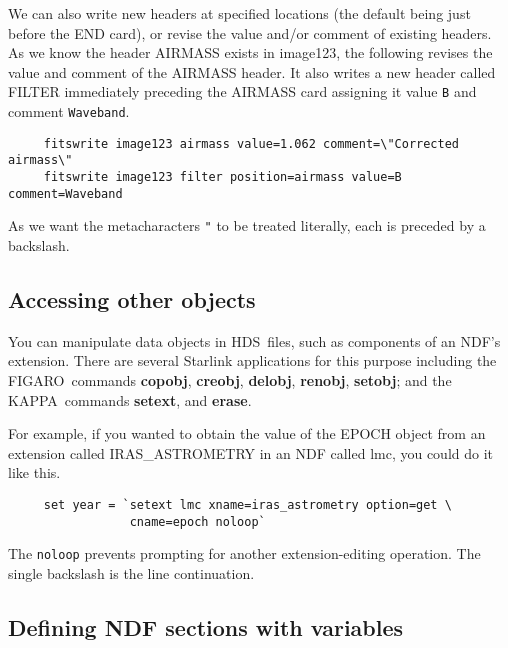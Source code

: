 \documentclass[twoside,11pt]{article}
\newcommand{\htmlref}[2]{#1}
\newcommand{\xref}[3]{#1}
\newcommand{\xlabel}[1]{}
\newcommand{\Figaroref}{\xref{{\footnotesize FIGARO}}{sun86}{}}
\newcommand{\HDSref}{\xref{HDS}{sun92}{}}
\newcommand{\KAPPAref}{\xref{{\footnotesize KAPPA}}{sun95}{}}
\newcommand{\NDFref}[1]{\xref{#1}{sun33}{}}
\begin{document}
We can also write new headers at specified locations (the default being
just before the END card), or revise the value and/or comment of existing
headers.  As we know the header AIRMASS exists in image123, the
following revises the value and comment of the AIRMASS header.
It also writes a new header called FILTER immediately preceding the
AIRMASS card assigning it value {\tt B} and comment {\tt Waveband}.

\small
\begin{verbatim}
     fitswrite image123 airmass value=1.062 comment=\"Corrected airmass\"
     fitswrite image123 filter position=airmass value=B comment=Waveband
\end{verbatim}
\normalsize

As we want the \htmlref{{\sf metacharacters}}{sc4_gl_met} {\tt "} to be
treated literally, each is preceded by a backslash.

\subsection{\xlabel{sc4_se_other_objects}Accessing other objects
\label{sc4_se_other_objects}}

You can manipulate data objects in \HDSref\ files, such as components
of an \NDFref{{\sf NDF}'s} extension.  There are several Starlink
applications for this purpose including the \Figaroref\ commands
\xref{{\bf copobj}}{sun86}{COPOBJ},
\xref{{\bf creobj}}{sun86}{CREOBJ}, \xref{{\bf delobj}}{sun86}{DELOBJ},
\xref{{\bf renobj}}{sun86}{RENOBJ}, \xref{{\bf setobj}}{sun86}{SETOBJ}; and
the \KAPPAref\ commands \xref{{\bf setext}}{sun95}{SETEXT}, and
\xref{{\bf erase}}{sun95}{ERASE}.

For example, if you wanted to obtain the value of the EPOCH object
from an extension called IRAS\_ASTROMETRY in an NDF called lmc,
you could do it like this. 

\small
\begin{verbatim}
     set year = `setext lmc xname=iras_astrometry option=get \
                 cname=epoch noloop`
\end{verbatim}
\normalsize
The {\tt noloop} prevents prompting for another extension-editing
operation.  The single backslash is the line continuation.

\subsection{\xlabel{sc4_se_NDF_section}Defining NDF sections with
variables\label{sc4_se_NDF_section}}
\end{document}
